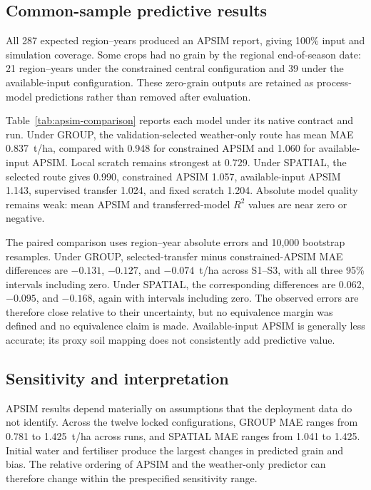 \documentclass[runningheads]{venue/lncs/llncs}
\begin{document}
\subsection{Common-sample predictive results}

All 287 expected region--years produced an APSIM report, giving 100\% input and simulation coverage. Some crops had no grain by the regional end-of-season date: 21 region--years under the constrained central configuration and 39 under the available-input configuration. These zero-grain outputs are retained as process-model predictions rather than removed after evaluation.

Table~\ref{tab:apsim-comparison} reports each model under its native contract and run. Under GROUP, the validation-selected weather-only route has mean MAE 0.837~t/ha, compared with 0.948 for constrained APSIM and 1.060 for available-input APSIM. Local scratch remains strongest at 0.729. Under SPATIAL, the selected route gives 0.990, constrained APSIM 1.057, available-input APSIM 1.143, supervised transfer 1.024, and fixed scratch 1.204. Absolute model quality remains weak: mean APSIM and transferred-model $R^2$ values are near zero or negative.



The paired comparison uses region--year absolute errors and 10,000 bootstrap resamples. Under GROUP, selected-transfer minus constrained-APSIM MAE differences are $-0.131$, $-0.127$, and $-0.074$~t/ha across S1--S3, with all three 95\% intervals including zero. Under SPATIAL, the corresponding differences are 0.062, $-0.095$, and $-0.168$, again with intervals including zero. The observed errors are therefore close relative to their uncertainty, but no equivalence margin was defined and no equivalence claim is made. Available-input APSIM is generally less accurate; its proxy soil mapping does not consistently add predictive value.



\subsection{Sensitivity and interpretation}

APSIM results depend materially on assumptions that the deployment data do not identify. Across the twelve locked configurations, GROUP MAE ranges from 0.781 to 1.425~t/ha across runs, and SPATIAL MAE ranges from 1.041 to 1.425. Initial water and fertiliser produce the largest changes in predicted grain and bias. The relative ordering of APSIM and the weather-only predictor can therefore change within the prespecified sensitivity range.
\end{document}
